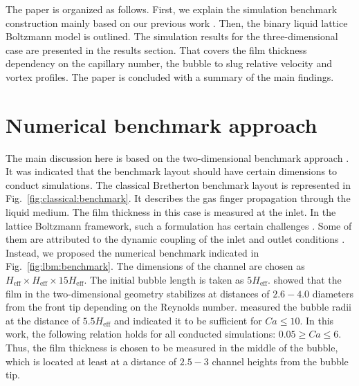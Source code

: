 \documentclass[preprint,12pt]{elsarticle}
\begin{document}
The paper is organized as follows.  First, we explain the simulation benchmark construction
mainly based on our previous work \cite{kuzmin-binary2d}. Then, the binary liquid lattice
Boltzmann model is outlined. The simulation results for the three-dimensional case are presented in
the results section. That covers the film thickness dependency on the capillary number, the bubble
to slug relative velocity and vortex profiles. The paper
is concluded with a summary of the main findings.

\section{Numerical benchmark approach}
\label{sec:numerical:benchmark}
The main discussion here is based on the two-dimensional benchmark approach
\cite{kuzmin-binary2d}. It was indicated that the benchmark layout should have certain
dimensions to conduct simulations. The classical Bretherton benchmark layout is represented in
Fig.~\ref{fig:classical:benchmark}. It describes the gas finger propagation through the liquid
medium.
The film thickness in this case is measured at the inlet. In the lattice Boltzmann framework, such a
formulation has certain challenges \cite{kuzmin-binary2d}. Some of them are attributed to the
dynamic coupling of the inlet and outlet conditions \cite{giavedoni-numerical}. Instead, we
proposed the numerical benchmark indicated in Fig.~\ref{fig:lbm:benchmark}. The dimensions of the
channel are chosen as $H_{\mathrm{eff}}\times H_{\mathrm{eff}} \times 15 H_{\mathrm{eff}}$. The
initial bubble length is taken as $5 H_{\mathrm{eff}}$. \citet{giavedoni-numerical} showed that
the film in the two-dimensional geometry stabilizes at distances of $2.6-4.0$ diameters
from the front tip depending on the Reynolds number. \citet{heil-threedim} measured the bubble radii
at the distance of $5.5 H_{\mathrm{eff}}$ and indicated it to be sufficient for $Ca\leq 10$. In
this work, the following relation holds for all conducted simulations: $0.05 \geq Ca \leq 6$.
Thus, the
film thickness is chosen to be measured in the
middle of the bubble, which is located at least at a distance of $2.5-3$ channel heights from the 
bubble tip.%
\end{document}
